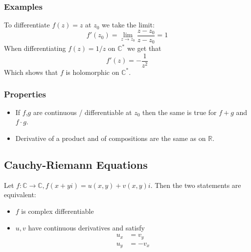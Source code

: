 \subsubsection{Examples}
To differentiate $f(z)=z$ at $z_0$ we take the limit:
$$
f'(z_0) = \lim_{z\to z_0} \frac{z-z_0}{z-z_0} = 1
$$
When differentiating $f(z)=1/z$ on $\mathbb C^\ast$ we get that $$f'(z)=-\frac 1{z^2}$$ Which shows that $f$ is holomorphic on $\mathbb C^\ast$.

\subsubsection{Properties}
\begin{itemize}
    \item If $f$,$g$ are continuous / differentiable at $z_0$ then the same is true for $f+g$ and $f\cdot g$.
    \item Derivative of a product and of compositions are the same as on $\mathbb{R}$.
\end{itemize}

\subsection{Cauchy-Riemann Equations}
Let $f:\mathbb C \to\mathbb C, f(x+yi)=u(x,y)+v(x,y)i$. 
Then the two statements are equivalent:
\begin{itemize}
    \item $f$ is complex differentiable
    \item $u,v$ have continuous derivatives and satisfy
    \begin{equation*}
        \begin{split}
            u_x&=v_y\\
            u_y&=-v_x
        \end{split}
    \end{equation*}
\end{itemize}




